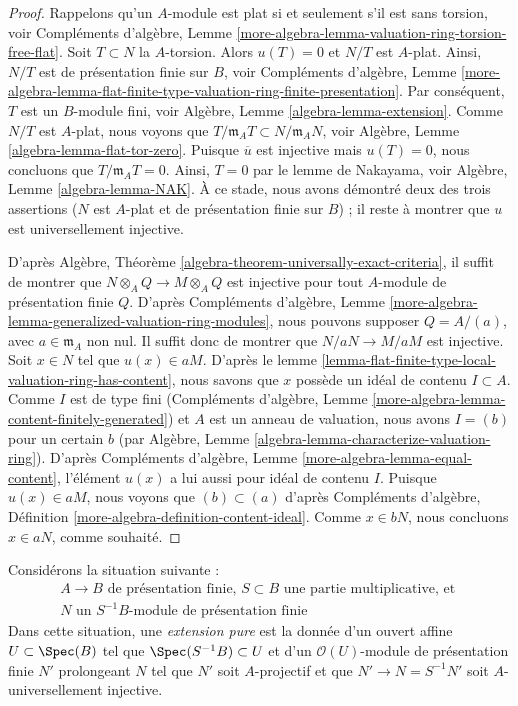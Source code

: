\begin{proof}
Rappelons qu'un $A$-module est plat si et seulement s'il est sans torsion, voir
Compléments d'algèbre, Lemme
\ref{more-algebra-lemma-valuation-ring-torsion-free-flat}.
Soit $T \subset N$ la $A$-torsion. Alors $u(T) = 0$ et
$N/T$ est $A$-plat. Ainsi, $N/T$ est de présentation finie sur $B$, voir
Compléments d'algèbre, Lemme
\ref{more-algebra-lemma-flat-finite-type-valuation-ring-finite-presentation}.
Par conséquent, $T$ est un $B$-module fini, voir
Algèbre, Lemme \ref{algebra-lemma-extension}.
Comme $N/T$ est $A$-plat, nous voyons que
$T/\mathfrak m_A T \subset N/\mathfrak m_A N$, voir
Algèbre, Lemme \ref{algebra-lemma-flat-tor-zero}.
Puisque $\overline{u}$ est injective mais $u(T) = 0$, nous concluons que
$T/\mathfrak m_A T = 0$. Ainsi, $T = 0$ par le lemme de Nakayama, voir
Algèbre, Lemme \ref{algebra-lemma-NAK}. À ce stade, nous avons
démontré deux des trois assertions ($N$ est $A$-plat et
de présentation finie sur $B$) ; il reste à montrer que
$u$ est universellement injective.

\medskip\noindent
D'après Algèbre, Théorème \ref{algebra-theorem-universally-exact-criteria},
il suffit de montrer que $N \otimes_A Q \to M \otimes_A Q$ est injective
pour tout $A$-module de présentation finie $Q$. D'après
Compléments d'algèbre, Lemme
\ref{more-algebra-lemma-generalized-valuation-ring-modules},
nous pouvons supposer $Q = A/(a)$, avec $a \in \mathfrak m_A$ non nul.
Il suffit donc de montrer que $N/aN \to M/aM$ est injective.
Soit $x \in N$ tel que $u(x) \in aM$. D'après le
lemme \ref{lemma-flat-finite-type-local-valuation-ring-has-content},
nous savons que $x$ possède un idéal de contenu $I \subset A$. Comme
$I$ est de type fini
(Compléments d'algèbre, Lemme \ref{more-algebra-lemma-content-finitely-generated})
et $A$ est un anneau de valuation, nous avons $I = (b)$ pour un certain $b$
(par Algèbre, Lemme \ref{algebra-lemma-characterize-valuation-ring}).
D'après Compléments d'algèbre, Lemme \ref{more-algebra-lemma-equal-content},
l'élément $u(x)$ a lui aussi pour idéal de contenu $I$.
Puisque $u(x) \in aM$, nous voyons que $(b) \subset (a)$
d'après Compléments d'algèbre, Définition \ref{more-algebra-definition-content-ideal}.
Comme $x \in bN$, nous concluons $x \in aN$, comme souhaité.
\end{proof}

\noindent
Considérons la situation suivante :
\begin{equation}
\label{equation-star}
\begin{matrix}
A \to B\text{ de présentation finie, }S \subset B
\text{ une partie multiplicative, et }\\
N\text{ un }S^{-1}B\text{-module de présentation finie}
\end{matrix}
\end{equation}
Dans cette situation, une {\it extension pure} est la donnée d'un ouvert affine
$U \subset \Spec(B)$ tel que $\Spec(S^{-1}B) \subset U$ et d'un
$\mathcal{O}(U)$-module de présentation finie $N'$ prolongeant $N$
tel que $N'$ soit $A$-projectif et que $N' \to N = S^{-1}N'$
soit $A$-universellement injective.


